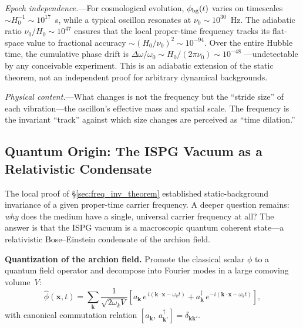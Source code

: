 \documentclass[11pt]{article}
\begin{document}
\medskip
\textit{Epoch independence.}---For cosmological evolution,
$\phi_{\rm bg}(t)$ varies on timescales
$\sim H_0^{-1} \sim 10^{17}$~s, while a typical oscillon resonates
at $\nu_0 \sim 10^{30}$~Hz.  The adiabatic ratio
$\nu_0/H_0 \sim 10^{47}$ ensures that the local proper-time
frequency tracks its flat-space value to fractional accuracy
$\sim (H_0/\nu_0)^2 \sim 10^{-94}$.  Over the entire Hubble
time, the cumulative phase drift is
$\Delta\omega/\omega_0 \sim H_0/(2\pi\nu_0) \sim 10^{-48}$
---undetectable by any conceivable experiment.
This is an adiabatic extension of the static theorem, not an
independent proof for arbitrary dynamical backgrounds.

\medskip
\textit{Physical content.}---What changes is not the frequency but
the ``stride size'' of each vibration---the oscillon's effective
mass and spatial scale.  The frequency is the invariant ``track''
against which size changes are perceived as ``time dilation.''

\bigskip
\begin{center}
\end{center}
\bigskip

\subsection{Quantum Origin: The ISPG Vacuum as a
  Relativistic Condensate}
\label{sec:condensate}

The local proof of \S\ref{sec:freq_inv_theorem}
established static-background invariance of a given proper-time
carrier frequency.  A deeper question remains: \emph{why}
does the medium have a single, universal carrier frequency at all?
The answer is that the ISPG vacuum is a macroscopic quantum
coherent state---a relativistic Bose--Einstein condensate
\cite{PethickSmith2008,Leggett2001} of
the archion field.

\medskip
\textbf{Quantization of the archion field.}
Promote the classical scalar $\phi$ to a quantum field
operator and decompose into Fourier modes in a large
comoving volume~$V$:
\begin{equation}
  \hat\phi(\mathbf{x},t)
  = \sum_{\mathbf{k}}
    \frac{1}{\sqrt{2\omega_k V}}
    \!\left[
      a_{\mathbf{k}}\,
      e^{\,i(\mathbf{k}\cdot\mathbf{x}-\omega_k t)}
      + a_{\mathbf{k}}^\dagger\,
      e^{-i(\mathbf{k}\cdot\mathbf{x}-\omega_k t)}
    \right],
  \label{eq:phi_quantized}
\end{equation}
with canonical commutation relation
$[a_{\mathbf{k}},\,a_{\mathbf{k}'}^\dagger]
= \delta_{\mathbf{k}\mathbf{k}'}$.
\end{document}
